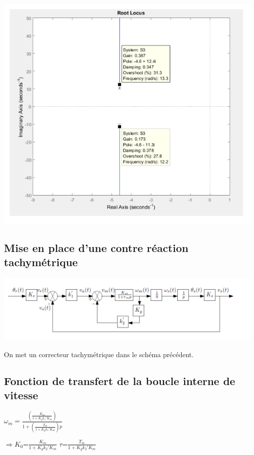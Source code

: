 \begin{center}
\includegraphics[scale=0.5]{fiiig4.png}
\label{fig4} 
\end{center}

\subsection{Mise en place d'une contre réaction tachymétrique}


\begin{center}
\includegraphics[scale=0.5]{fiiig5.png} 
\end{center}
On met un correcteur tachymétrique dans le schéma précédent.

\subsection{Fonction de transfert de la boucle interne de vitesse}

$\omega_m=\frac{(\frac{K_m}{1+K_gk_1'K_m})}{1+(\frac{T_m}{1+K_gk_1'K_m})p}$

$\Rightarrow K_0$=$\frac{K_m}{1+K_gk_2'K_m}$ 
 $\tau$=$\frac{T_m}{1+K_gk_2'K_m}$


%
%
